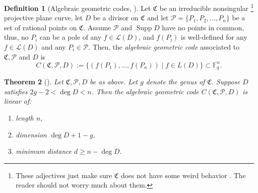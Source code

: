 \documentclass[11pt, oneside]{amsart}
\newtheorem{thm}{Theorem}[section]
\theoremstyle{definition}
\newtheorem{defn}[thm]{Definition}
\theoremstyle{remark}
\numberwithin{equation}{section}
\DeclareMathOperator{\Supp}{Supp}
\begin{document}
\begin{defn}[Algebraic geometric codes, \cite{LS87, Wal00}] %
	Let $\mathfrak C$ be an irreducible nonsingular%
	\footnote{These adjectives just make sure $\mathfrak C$ does not have some weird behavior%
	. The reader should not worry much about them.}
	projective plane curve, let $D$ be a divisor on $\mathfrak C$ and let $\mathcal P = \{P_1, P_2, \dots, P_n\}$ be a set of rational points on $\mathfrak C$.
	Assume $\mathcal P$ and $\Supp D$ have no points in common, thus, no $P_i$ can be a pole of any $f \in \mathcal L(D)$, and $f(P_i)$ is well-defined for any $f \in \mathcal L(D)$ and any $P_i \in \mathcal P$.
	Then, the \emph{algebraic geometric code} associated to $\mathfrak C, \mathcal P$ and $D$ is
	\begin{equation}
		C(\mathfrak C, \mathcal P, D) := \{(f(P_1), \dots, f(P_n)) \mid f \in L(D)\} \subset \mathbb{F}_q^n.
	\end{equation}
\end{defn}

\begin{thm}[\cite{Wal00}]
	Let $\mathfrak C, \mathcal P, D$ be as above. Let $g$ denote the genus of $\mathfrak C$. Suppose $D$ satisfies $2g - 2 < \deg D < n$. Then the algebraic geometric code $C(\mathfrak C, \mathcal P, D)$ is linear of:
	\begin{enumerate}[label = \textbullet, itemsep = 0pt]
		\item length $n$,
		\item dimension $\deg D + 1 - g$,
		\item minimum distance $d \ge n - \deg D$.
	\end{enumerate}
\end{thm}
\end{document}
